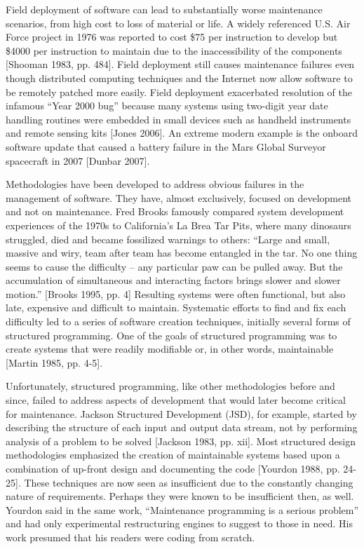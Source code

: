 Field deployment of software can lead to substantially worse maintenance scenarios, from high cost to loss of material or life.  A widely referenced U.S. Air Force project in 1976 was reported to cost \$75 per instruction to develop but \$4000 per instruction to maintain due to the inaccessibility of the components [Shooman 1983, pp. 484].  Field deployment still causes maintenance failures even though distributed computing techniques and the Internet now allow software to be remotely patched more easily. Field deployment exacerbated resolution of the infamous ``Year 2000 bug'' because many systems using two-digit year date handling routines were embedded in small devices such as handheld instruments and remote sensing kits [Jones 2006].  An extreme modern example is the onboard software update that caused a battery failure in the Mars Global Surveyor spacecraft in 2007 [Dunbar 2007].

Methodologies have been developed to address obvious failures in the management of software.  They have, almost exclusively, focused on development and not on maintenance.  Fred Brooks famously compared system development experiences of the 1970s to California's La Brea Tar Pits, where many dinosaurs struggled, died and became fossilized warnings to others: ``Large and small, massive and wiry, team after team has become entangled in the tar.  No one thing seems to cause the difficulty -- any particular paw can be pulled away.  But the accumulation of simultaneous and interacting factors brings slower and slower motion.'' [Brooks 1995, pp. 4]  Resulting systems were often functional, but also late, expensive and difficult to maintain.  Systematic efforts to find and fix each difficulty led to a series of software creation techniques, initially several forms of structured programming.  One of the goals of structured programming was to create systems that were readily modifiable or, in other words, maintainable [Martin 1985, pp. 4-5].

Unfortunately, structured programming, like other methodologies before and since, failed to address aspects of development that would later become critical for maintenance.  Jackson Structured Development (JSD), for example, started by describing the structure of each input and output data stream, not by performing analysis of a problem to be solved [Jackson 1983, pp. xii].  Most structured design methodologies emphasized the creation of maintainable systems based upon a combination of up-front design and documenting the code [Yourdon 1988, pp. 24-25].  These techniques are now seen as insufficient due to the constantly changing nature of requirements.  Perhaps they were known to be insufficient then, as well.  Yourdon said in the same work, ``Maintenance programming is a serious problem'' and had only experimental restructuring engines to suggest to those in need.  His work presumed that his readers were coding from scratch.

